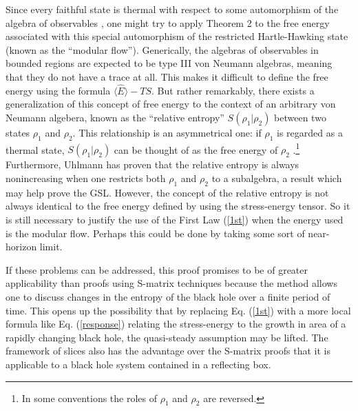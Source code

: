 \documentclass{article}
\begin{document}
Since every faithful state is thermal with respect to some automorphism of the algebra of observables \cite{KR}, one might try to apply Theorem 2 to the free energy associated with this special automorphism of the restricted Hartle-Hawking state (known as the ``modular flow'').  Generically, the algebras of observables in bounded regions are expected to be type III von Neumann algebras, meaning that they do not have a trace at all.  This makes it difficult to define the free energy using the formula $\langle \hat{E} \rangle - TS$.  But rather remarkably, there exists a generalization of this concept of free energy to the context of an arbitrary von Neumann algebera, known as the ``relative entropy'' $S(\rho_{1} | \rho_{2})$ between two states $\rho_{1}$ and $\rho_{2}$.  This relationship is an asymmetrical one: if $\rho_{1}$ is regarded as a thermal state, $S(\rho_{1} | \rho_{2})$ can be thought of as the free energy of $\rho_{2}$ \cite{araki75}.\footnote{In some conventions the roles of $\rho_{1}$ and $\rho_{2}$ are reversed.}  Furthermore, Uhlmann \cite{lindblad75} has proven that the relative entropy is always nonincreasing when one restricts both $\rho_{1}$ and $\rho_{2}$ to a subalgebra, a result which may help prove the GSL.  However, the concept of the relative entropy is not always identical to the free energy defined by using the stress-energy tensor.  So it is still necessary to justify the use of the First Law (\ref{1st}) when the energy used is the modular flow.  Perhaps this could be done by taking some sort of near-horizon limit.

If these problems can be addressed, this proof promises to be of greater applicability than proofs using S-matrix techniques because the method allows one to discuss changes in the entropy of the black hole over a finite period of time.  This opens up the possibility that by replacing Eq. (\ref{1st}) with a more local formula like Eq. (\ref{response}) relating the stress-energy to the growth in area of a rapidly changing black hole, the quasi-steady assumption may be lifted.  The framework of slices also has the advantage over the S-matrix proofs that it is applicable to a black hole system contained in a reflecting box.
\end{document}
